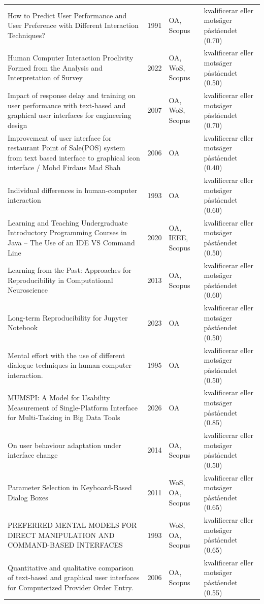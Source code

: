 \begin{longtable}{@{}%
  >{\raggedright\arraybackslash}p{}c%
  >{\raggedright\arraybackslash}p{}%
  >{\raggedright\arraybackslash}p{}@{}}
How to Predict User Performance and User Preference with Different Interaction Techniques? & 1991 & OA, Scopus & kvalificerar eller motsäger påståendet (0.70) \\
Human Computer Interaction Proclivity Formed from the Analysis and Interpretation of Survey & 2022 & OA, WoS, Scopus & kvalificerar eller motsäger påståendet (0.50) \\
Impact of response delay and training on user performance with text-based and graphical user interfaces for engineering design & 2007 & OA, WoS, Scopus & kvalificerar eller motsäger påståendet (0.70) \\
Improvement of user interface for restaurant Point of Sale(POS) system from text based interface to graphical icon interface / Mohd Firdaus Mad Shah & 2006 & OA & kvalificerar eller motsäger påståendet (0.40) \\
Individual differences in human-computer interaction & 1993 & OA & kvalificerar eller motsäger påståendet (0.60) \\
Learning and Teaching Undergraduate Introductory Programming Courses in Java -- The Use of an IDE VS Command Line & 2020 & OA, IEEE, Scopus & kvalificerar eller motsäger påståendet (0.50) \\
Learning from the Past: Approaches for Reproducibility in Computational Neuroscience & 2013 & OA, Scopus & kvalificerar eller motsäger påståendet (0.60) \\
Long-term Reproducibility for Jupyter Notebook & 2023 & OA & kvalificerar eller motsäger påståendet (0.50) \\
Mental effort with the use of different dialogue techniques in human-computer interaction. & 1995 & OA & kvalificerar eller motsäger påståendet (0.50) \\
MUMSPI: A Model for Usability Measurement of Single-Platform Interface for Multi-Tasking in Big Data Tools & 2026 & OA & kvalificerar eller motsäger påståendet (0.85) \\
On user behaviour adaptation under interface change & 2014 & OA, Scopus & kvalificerar eller motsäger påståendet (0.50) \\
Parameter Selection in Keyboard-Based Dialog Boxes & 2011 & WoS, OA, Scopus & kvalificerar eller motsäger påståendet (0.65) \\
PREFERRED MENTAL MODELS FOR DIRECT MANIPULATION AND COMMAND-BASED INTERFACES & 1993 & WoS, OA, Scopus & kvalificerar eller motsäger påståendet (0.65) \\
Quantitative and qualitative comparison of text-based and graphical user interfaces for Computerized Provider Order Entry. & 2006 & OA, Scopus & kvalificerar eller motsäger påståendet (0.55) \\

\end{longtable}
